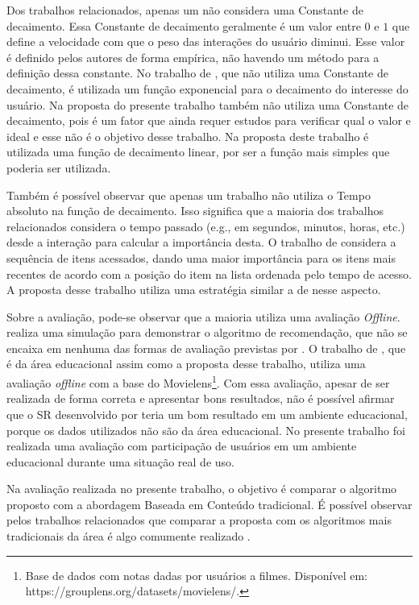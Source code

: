 Dos trabalhos relacionados, apenas um não considera uma Constante de decaimento. Essa Constante de decaimento geralmente
é um valor entre $0$ e $1$ que define a velocidade com que o peso das interações do usuário diminui. Esse valor é definido
pelos autores de forma empírica, não havendo um método para a definição dessa constante. No trabalho de ,
que não utiliza uma Constante de decaimento, é utilizada um função exponencial para o decaimento do interesse do usuário. Na
proposta do presente trabalho também não utiliza uma Constante de decaimento, pois é um fator que ainda requer estudos para
verificar qual o valor e ideal e esse não é o objetivo desse trabalho. Na proposta deste trabalho é utilizada uma função de decaimento linear,
por ser a função mais simples que poderia ser utilizada.

Também é possível observar que apenas um trabalho não utiliza o Tempo absoluto na função de decaimento. Isso significa que
a maioria dos trabalhos relacionados considera o tempo passado (e.g., em segundos, minutos, horas, etc.) desde a interação
para calcular a importância desta. O trabalho de  considera a sequência de itens acessados, dando
uma maior importância para os itens mais recentes de acordo com a posição do item na lista ordenada pelo tempo de acesso.
A proposta desse trabalho utiliza uma estratégia similar a de  nesse aspecto.

Sobre a avaliação, pode-se observar que a maioria utiliza uma avaliação \textit{Offline}.  realiza
uma simulação para demonstrar o algoritmo de recomendação, que não se encaixa em nenhuma das formas de avaliação
previstas por . O trabalho de , que é da área educacional assim como a
proposta desse trabalho, utiliza uma avaliação \textit{offline} com a base do Movielens\footnote{Base de dados com
notas dadas por usuários a filmes. Disponível em: https://grouplens.org/datasets/movielens/.}.
Com essa avaliação, apesar de ser realizada de forma correta e apresentar bons resultados, não é possível afirmar que o
SR desenvolvido por  teria um bom resultado em um ambiente educacional, porque os dados utilizados
não são da área educacional. No presente trabalho foi realizada uma avaliação com participação de usuários em um ambiente educacional durante uma situação real de uso.

Na avaliação realizada no presente trabalho, o objetivo é comparar o algoritmo proposto com a abordagem Baseada
em Conteúdo tradicional. É possível observar pelos trabalhos relacionados que comparar a proposta com os algoritmos mais
tradicionais da área é algo comumente realizado \cite{fan2015modeling, luo2010context, hawalah2014utilizing, qiao2015personalized, wei2013web}.

